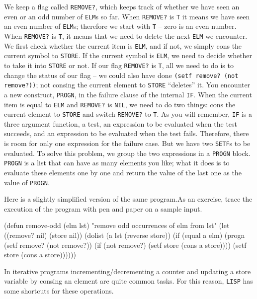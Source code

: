 \documentclass[a4paper,11pt]{article}
\begin{document}
\begin{uenum}
\begin{uenumi}
We keep a flag called \Verb+REMOVE?+, which keeps track of whether we have seen an even or an odd number of \Verb+ELM+s so far. When \Verb+REMOVE?+ is \Verb+T+ it means we have seen an even number of \Verb+ELM+s; therefore we start with \Verb+T+ -- zero is an even number. When \Verb+REMOVE?+ is \Verb+T+, it means that we need to delete the next \Verb+ELM+ we encounter. We first check whether the current item is \Verb+ELM+, and if not, we simply cons the current symbol to \Verb+STORE+. If the current symbol is \Verb+ELM+, we need to decide whether to take it into \Verb+STORE+ or not. If our flag \Verb+REMOVE?+ is \Verb+T+, all we need to do is to change the status of our flag -- we could also have done \Verb+(setf remove? (not remove?))+; not consing the current element to \Verb+STORE+ ``deletes'' it. You encounter a new construct, \Verb+PROGN+, in the failure clause of the internal \Verb+IF+. When the current item is equal to \Verb+ELM+ and \Verb+REMOVE?+ is \Verb+NIL+, we need to do two things: cons the current element to \Verb+STORE+ and switch \Verb+REMOVE?+ to \Verb+T+. As you will remember, \Verb+IF+ is a three argument function, a test, an expression to be evaluated when the test succeeds, and an expression to be evaluated when the test fails. Therefore, there is room for only one expression for the failure case. But we have two \Verb+SETF+s to be evaluated. To solve this problem, we group the two expressions in a \Verb+PROGN+ block. \Verb+PROGN+ is a list that can have as many elements you like; what it does is to evaluate these elements one by one and return the value of the last one as the value of \Verb+PROGN+. 

\item Here is a slightly simplified version of the same program.As an exercise, trace the execution of the program with pen and paper on a sample input.

\begin{lispcode}
(defun remove-odd (elm lst)
  "remove odd occurrences of elm from lst"
  (let ((remove? nil)
		(store nil))
	(dolist (a lst (reverse store))
	  (if (equal a elm)
		(progn
		  (setf remove? (not remove?))
		  (if (not remove?)
			(setf store (cons a store))))
		(setf store (cons a store))))))
\end{lispcode}

\end{uenumi}

\item In iterative programs incrementing/decrementing a counter and updating a store variable by consing an element are quite common tasks. For this reason, \Verb+LISP+ has some shortcuts for these operations. 


\end{uenum}
\end{document}
